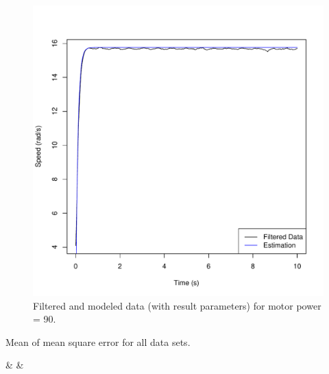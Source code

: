 \documentclass[a4paper,12pt,oneside]{article}
\begin{document}
\begin{figure}[t]%
	\centering
	\includegraphics[width=\columnwidth]{../motor_data/plots/result_estimation/90}
	\caption{Filtered and modeled data (with result parameters) for motor power = 90.}%
	\label{fig:fit_res}%
\end{figure}

\begin{table}
\centering
\caption{Mean of mean square error for all data sets.}
\label{table:square_error}
%
{\p & \rg & \rr}%
\end{table}
\end{document}
